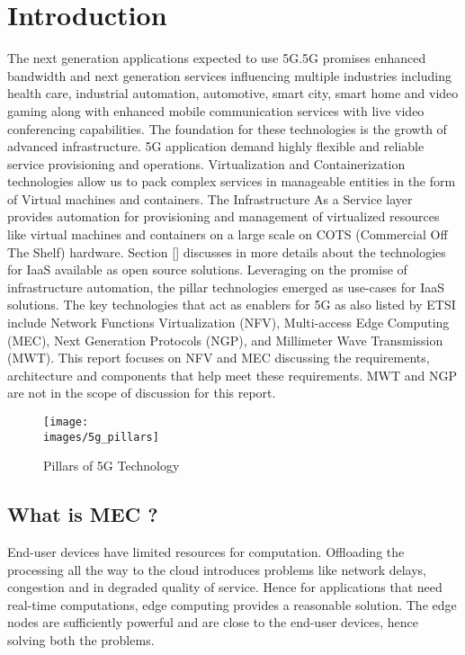 \section{Introduction}


The next generation applications expected to use 5G.5G promises enhanced bandwidth and next generation services influencing multiple industries including health care, industrial automation, automotive, smart city, smart home and video gaming along with enhanced mobile communication services with live video conferencing capabilities. The foundation for these technologies is the growth of advanced infrastructure. 5G application demand highly flexible and reliable service provisioning and operations. Virtualization and Containerization technologies allow us to pack complex services in manageable entities in the form of Virtual machines and containers. The Infrastructure As a Service layer provides automation for provisioning and management of virtualized resources like virtual machines and containers on a large scale on COTS (Commercial Off The Shelf) hardware. Section [] discusses in more details about the technologies for IaaS available as open source solutions. Leveraging on the promise of infrastructure automation, the pillar technologies emerged as use-cases for IaaS solutions. The key technologies that act as enablers for 5G as also listed by ETSI include Network Functions Virtualization (NFV), Multi-access Edge Computing (MEC), Next Generation Protocols (NGP), and Millimeter Wave Transmission (MWT). This report focuses on NFV and MEC discussing the requirements, architecture and components that help meet these requirements. MWT and NGP are not in the scope of discussion for this report.

\begin{figure}
	\centering
	\texttt{[image: \\images/5g\_pillars]}
	\label{fig:figure1}
	\caption{Pillars of 5G Technology}
\end{figure}

\subsection{What is MEC ?}

End-user devices have limited resources for computation. Offloading the processing all the way to the cloud introduces problems like network delays, congestion and in degraded quality of service. Hence for applications that need real-time computations, edge computing provides a reasonable solution. The edge nodes are sufficiently powerful and are close to the end-user devices, hence solving both the problems.

